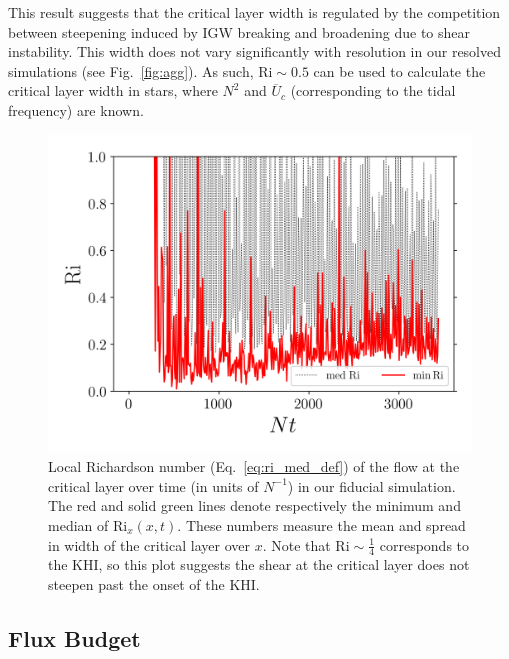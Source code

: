 \documentclass[
        fleqn,
        usenatbib,
    ]{mnras}
\begin{document}
This result suggests that the critical layer width is regulated by the
competition between steepening induced by IGW breaking and broadening due to
shear instability. This width does not vary significantly with resolution in our
resolved simulations (see Fig.~\ref{fig:agg}). As such, $\mathrm{Ri} \sim 0.5$
can be used to calculate the critical layer width in stars, where $N^2$ and
$\overline{U}_c$ (corresponding to the tidal frequency) are known.
\begin{figure}
    \centering
    \includegraphics[width=0.9\columnwidth]{plots/nl_f_ri.png}
    \caption{Local Richardson number (Eq.~\eqref{eq:ri_med_def}) of the flow at
    the critical layer over time (in units of $N^{-1}$) in our fiducial
    simulation. The red and solid green lines denote respectively the minimum
    and median of $\mathrm{Ri}_x(x, t)$. These numbers measure the mean and
    spread in width of the critical layer over $x$. Note that $\mathrm{Ri} \sim
    \frac{1}{4}$ corresponds to the KHI, so this plot suggests the shear at the
    critical layer does not steepen past the onset of the
    KHI.}\label{fig:nl_f_ri}
\end{figure}

\subsection{Flux Budget}\label{ss:flux_budget}
\end{document}
